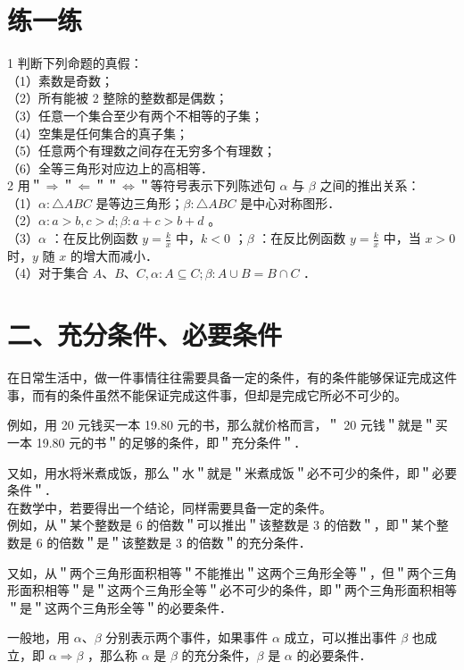 \documentclass[10pt]{article}
\begin{document}
\section*{练一练}
1 判断下列命题的真假：\\
（1）素数是奇数；\\
（2）所有能被 2 整除的整数都是偶数；\\
（3）任意一个集合至少有两个不相等的子集；\\
（4）空集是任何集合的真子集；\\
（5）任意两个有理数之间存在无穷多个有理数；\\
（6）全等三角形对应边上的高相等．\\
2 用＂\(\Rightarrow\)＂\(\Leftarrow\)＂＂\(\Leftrightarrow\)＂等符号表示下列陈述句 \(\alpha\) 与 \(\beta\) 之间的推出关系：\\
（1）\(\alpha: \triangle A B C\) 是等边三角形；\(\beta: \triangle A B C\) 是中心对称图形．\\
（2）\(\alpha: a>b, c>d ; \beta: a+c>b+d\) 。\\
（3）\(\alpha\) ：在反比例函数 \(y=\frac{k}{x}\) 中，\(k<0\) ；\(\beta\) ：在反比例函数 \(y=\frac{k}{x}\) 中，当 \(x>0\) 时，\(y\) 随 \(x\) 的增大而减小．\\
（4）对于集合 \(A 、 B 、 C, \alpha: A \subseteq C ; \beta: A \cup B=B \cap C\) ．

\section*{二、充分条件、必要条件}
在日常生活中，做一件事情往往需要具备一定的条件，有的条件能够保证完成这件事，而有的条件虽然不能保证完成这件事，但却是完成它所必不可少的。

例如，用 20 元钱买一本 19.80 元的书，那么就价格而言，＂ 20 元钱＂就是＂买一本 19.80 元的书＂的足够的条件，即＂充分条件＂．

又如，用水将米煮成饭，那么＂水＂就是＂米煮成饭＂必不可少的条件，即＂必要条件＂．\\
在数学中，若要得出一个结论，同样需要具备一定的条件。\\
例如，从＂某个整数是 6 的倍数＂可以推出＂该整数是 3 的倍数＂，即＂某个整数是 6 的倍数＂是＂该整数是 3 的倍数＂的充分条件．

又如，从＂两个三角形面积相等＂不能推出＂这两个三角形全等＂，但＂两个三角形面积相等＂是＂这两个三角形全等＂必不可少的条件，即＂两个三角形面积相等＂是＂这两个三角形全等＂的必要条件．

一般地，用 \(\alpha 、 \beta\) 分别表示两个事件，如果事件 \(\alpha\) 成立，可以推出事件 \(\beta\) 也成立，即 \(\alpha \Rightarrow \beta\) ，那么称 \(\alpha\) 是 \(\beta\) 的充分条件，\(\beta\) 是 \(\alpha\) 的必要条件．
\end{document}
